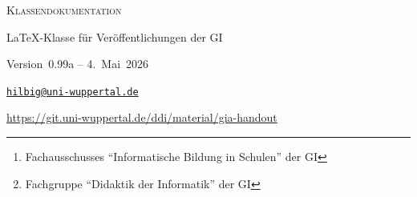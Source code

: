 \documentclass[a4paper]{article}
\author{Andr\'e \textsc{Hilbig} \qquad Frederick \textsc{Heyder}}
\title{\pkg{gia-handout}}
\date{20.~März~2026}
\newcommand{\GI}{GI}
\begin{document}
\begin{centering}

    \vspace*{0.03\textheight}

    {\Large\textsc{Klassendokumentation}}\par
    \vspace{1.5\baselineskip}

    {\huge\bfseries\makeatletter\@title\makeatother}\par
    \vspace{1\baselineskip}

    {\Large\LaTeX-Klasse für Veröffentlichungen der \GI}\par
    \vspace{1.2\baselineskip}

    {\large Version~0.99a -- 4.~Mai~2026}\par
    \vspace{2\baselineskip}

    {\large\makeatletter\@author\makeatother}\par
    \vspace{1.5\baselineskip}

    {\normalsize\href{mailto:hilbig@uni-wuppertal.de}{\nolinkurl{hilbig@uni-wuppertal.de}}}\par
    \vspace{0.67\baselineskip}

    {\normalsize\url{https://git.uni-wuppertal.de/ddi/material/gia-handout}}

\end{centering}

\vfill

\begin{abstract}
Die Klasse bündelt die Bemühungen des FA~IBS\footnote{Fachausschusses \enquote{Informatische Bildung in Schulen} der \GI}, der FG~DDI\footnote{Fachgruppe \enquote{Didaktik der Informatik} der \GI} und insbesondere von Andr\'e Hilbig, Veröffentlichungen der \GI\ im selben Stil wie die Bildungsstandards zu vereinheitlichen.
Hierbei werden spezifische Designvorgaben und Layouts berücksichtigt, um den Anforderungen des Corporate Design der \GI\ zu entsprechen.
\end{abstract}

\vfill

\begin{multicols}{2}
    \tableofcontents
\end{multicols}

\clearpage
\end{document}

